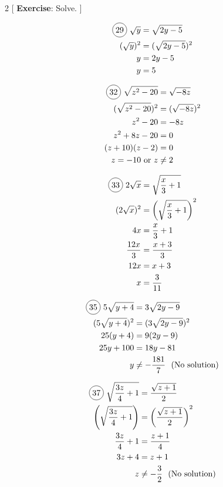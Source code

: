 \begin{multicols}{2}
[
  \textbf{Exercise}: Solve.
]

\begin{align*}
  \circled{29}\ \sqrt{y}&=\sqrt{2y-5}\\
  (\sqrt{y})^{2}&=(\sqrt{2y-5})^{2}\\
  y&=2y-5\\
  y&=5\\
\end{align*}

\begin{align*}
  \circled{32}\ \sqrt{z^{2}-20}&=\sqrt{-8z}\\
  (\sqrt{z^{2}-20})^{2}&=(\sqrt{-8z})^{2}\\
  z^{2}-20&=-8z\\
  z^{2}+8z-20&=0\\
  (z+10)(z-2)&=0\\
  z=-10 \text{ or } z&\neq2
\end{align*}

\begin{align*}
  \circled{33}\ 2\sqrt{x}&=\sqrt{\frac{x}{3}+1}\\
  (2\sqrt{x})^{2}&=\left( \sqrt{\frac{x}{3}+1} \right)^{2}\\
  4x&=\frac{x}{3}+1\\
  \frac{12x}{3}&=\frac{x+3}{3}\\
  12x&=x+3\\
  x&=\frac{3}{11}\\
\end{align*}

\begin{align*}
  \circled{35}\ 5\sqrt{y+4}&=3\sqrt{2y-9}\\
  (5\sqrt{y+4})^{2}&=(3\sqrt{2y-9})^{2}\\
  25(y+4)&=9(2y-9)\\
  25y+100&=18y-81\\
  y&\neq-\frac{181}{7}\ \text{ (No solution)}
\end{align*}

\begin{align*}
  \circled{37}\ \sqrt{\frac{3z}{4}+1}&=\frac{\sqrt{z+1}}{2}\\
  \left( \sqrt{\frac{3z}{4}+1}\right) &=\left( \frac{\sqrt{z+1}}{2} \right)^{2}\\
  \frac{3z}{4}+1&=\frac{z+1}{4}\\
  3z+4&=z+1\\
  z&\neq-\frac{3}{2}\ \text{ (No solution)}
\end{align*}
\end{multicols}

